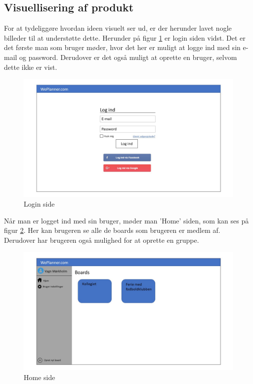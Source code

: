 \subsection{Visuellisering af produkt}
For at tydeliggøre hvordan ideen visuelt ser ud, er der herunder lavet nogle billeder til at understøtte dette. Herunder på figur \ref{fig:login_site} er login siden vidst. Det er det første man som bruger møder, hvor det her er muligt at logge ind med sin e-mail og password. Derudover er det også muligt at oprette en bruger, selvom dette ikke er vist.
\begin{figure}[H]
  \includegraphics[width=\linewidth]{Indledning/Images/Slide1.JPG}
  \caption{Login side}
  \label{fig:login_site}
\end{figure}

\noindent Når man er logget ind med sin bruger, møder man 'Home' siden, som kan ses på figur \ref{fig:home_site}. Her kan brugeren se alle de boards som brugeren er medlem af. Derudover har brugeren også mulighed for at oprette en gruppe.
\begin{figure}[H]
  \includegraphics[width=\linewidth]{Indledning/Images/Slide2.JPG}
  \caption{Home side}
  \label{fig:home_site}
\end{figure}

